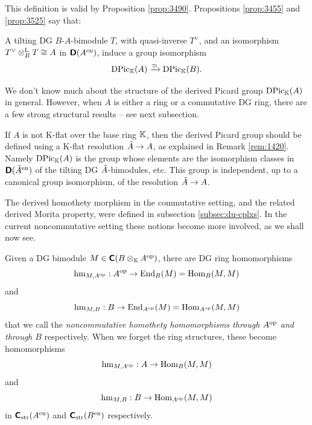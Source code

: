 This definition is valid by Proposition \ref{prop:3490}. 
Propositions \ref{prop:3455} and \ref{prop:3525} say that: 

\begin{cor} \label{cor:3525}
A tilting DG $B$-$A$-bimodule $T$, with quasi-inverse $T^{\vee}$, 
and an isomorphism 
$T^{\vee} \otimes^{\mathrm{L}}_{B} T \cong A$ in $\boldsymbol{\mathsf{D}}(A^{\mathrm{en}})$,
induce a group isomorphism 
\[ \operatorname{DPic}_{\mathbb{K}}(A) \xrightarrow{\simeq} \operatorname{DPic}_{\mathbb{K}}(B) . \]
\end{cor}

We don't know much about the structure of the derived Picard group 
$\operatorname{DPic}_{\mathbb{K}}(A)$ in general. However, when $A$ is either a ring
or a commutative DG ring, there are a few strong structural results -- see 
next subsection. 

\begin{rem} \label{rem:3595}
If $A$ is not K-flat over the base ring $\mathbb{K}$, then the derived Picard group 
should be defined using a K-flat resolution $\tilde{A} \to A$, as explained in 
Remark \ref{rem:1420}. Namely $\operatorname{DPic}_{\mathbb{K}}(A)$ is the group whose elements 
are the isomorphism classes in $\boldsymbol{\mathsf{D}}(\tilde{A}^{\mathrm{en}})$ of the tilting DG 
$\tilde{A}$-bimodules, etc. This group is independent, up to a canonical 
group isomorphism, of the resolution $\tilde{A} \to A$. 
\end{rem}

The derived homothety morphism in the commutative setting,
and the related derived Morita property, were defined in subsection 
\ref{subsec:du-cplxs}. In the current noncommutative setting these notions 
become more involved, as we shall now see.

Given a DG bimodule $M \in \boldsymbol{\mathsf{C}}(B \otimes_{\mathbb{K}} A^{\mathrm{op}})$, 
there are DG ring homomorphisms 
\[  \operatorname{hm}_{M, A^{\mathrm{op}}} : A^{\mathrm{op}} \to \operatorname{End}_{B}(M) = 
\operatorname{Hom}_{B}(M, M) \]
and
\[  \operatorname{hm}_{M, B} : B \to 
\operatorname{End}_{A^{\mathrm{op}}}(M) = \operatorname{Hom}_{A^{\mathrm{op}}}(M, M) \]
that we call the {\em noncommutative homothety homomorphisms through 
$A^{\mathrm{op}}$ and \lb through $B$} respectively. 
When we forget the ring structures, these become homomorphisms
\begin{equation} \label{eqn:4175}
\operatorname{hm}_{M, A^{\mathrm{op}}} : A \to \operatorname{Hom}_{B}(M, M) 
\end{equation}
and
\begin{equation} \label{eqn:4176}
\operatorname{hm}_{M, B} : B \to \operatorname{Hom}_{A^{\mathrm{op}}}(M, M)
\end{equation}
in $\boldsymbol{\mathsf{C}}_{\mathrm{str}}(A^{\mathrm{en}})$ and 
$\boldsymbol{\mathsf{C}}_{\mathrm{str}}(B^{\mathrm{en}})$ respectively. 

